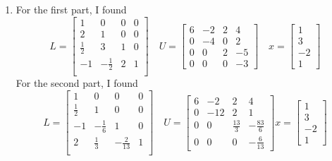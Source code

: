 \documentclass{article}
\begin{document}
\begin{enumerate}
\item For the first part, I found
\begin{equation*}
L = 
\begin{bmatrix}
	1 & 0 & 0 & 0\\
	2 & 1 & 0 & 0\\
	\frac{1}{2} & 3 & 1 & 0\\
	-1 & -\frac{1}{2} & 2 & 1\\
\end{bmatrix}
\quad 
U = 
\begin{bmatrix}
6 & -2 & 2 & 4\\
0 & -4 & 0 & 2\\
0 & 0 & 2 & -5\\
0 & 0 & 0 & -3	
\end{bmatrix}
\quad
x = 
\begin{bmatrix}
1\\
3\\
-2\\
1	
\end{bmatrix}
\end{equation*}
For the second part, I found
\begin{equation*}
L = 
\begin{bmatrix}
1 & 0 & 0 & 0\\
\frac{1}{2} & 1 & 0 & 0\\
-1 & -\frac{1}{6} & 1 & 0\\
2 & \frac{1}{3} & -\frac{2}{13} & 1\\	
\end{bmatrix}
\quad
U = 
\begin{bmatrix}
6 & -2 & 2 & 4\\
0 & -12 & 2 & 1\\
0 & 0 & \frac{13}{3} & -\frac{83}{6}\\
0 & 0 & 0 & -\frac{6}{13}	
\end{bmatrix}
x = 
\begin{bmatrix}
1\\
3\\
-2\\
1	
\end{bmatrix}
\end{equation*}


\end{enumerate}
\end{document}
